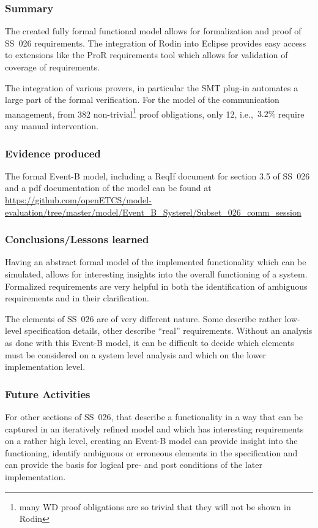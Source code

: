 \subsubsection{Summary}

The created fully formal functional model allows for formalization and proof of
SS~026 requirements. The integration of Rodin into Eclipse provides easy access
to extensions like the ProR requirements tool which allows for validation of
coverage of requirements.

The integration of various provers, in particular the SMT plug-in automates a
large part of the formal verification. For the model of the communication
management, from 382 non-trivial\footnote{many WD proof obligations are so
  trivial that they will not be shown in Rodin} proof obligations, only 12,
i.e.,\ $3.2\%$ require any manual intervention.

\subsubsection{Evidence produced}
\label{sec:evidence-produced}

The formal Event-B model, including a ReqIf document for section 3.5 of SS~026
and a pdf documentation of the model can be found at
\url{https://github.com/openETCS/model-evaluation/tree/master/model/Event_B_Systerel/Subset_026_comm_session}

\subsubsection{Conclusions/Lessons learned}

Having an abstract formal model of the implemented functionality which can be
simulated, allows for interesting insights into the overall functioning of a
system. Formalized requirements are very helpful in both the identification of
ambiguous requirements and in their clarification.

The elements of SS~026 are of very different nature. Some describe rather
low-level specification details, other describe ``real'' requirements. Without
an analysis as done with this Event-B model, it can be difficult to decide which
elements must be considered on a system level analysis and which on the lower
implementation level.


\subsubsection{Future Activities}
\label{sec:future-activities}

For other sections of SS~026, that describe a functionality in a way that can be
captured in an iteratively refined model and which has interesting requirements
on a rather high level, creating an Event-B model can provide insight into the
functioning, identify ambiguous or erroneous elements in the specification and
can provide the basis for logical pre- and post conditions of the later
implementation.

